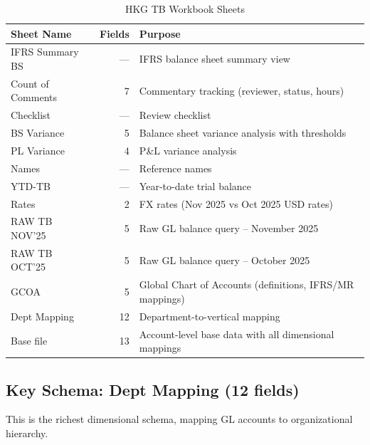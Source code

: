 \documentclass[11pt,a4paper]{article}
\begin{document}
\begin{table}[H]
\centering
\caption{HKG TB Workbook Sheets}
\begin{tabularx}{\textwidth}{lrX}
\toprule
\textbf{Sheet Name} & \textbf{Fields} & \textbf{Purpose} \\
\midrule
IFRS Summary BS   & ---  & IFRS balance sheet summary view \\
Count of Comments  & 7   & Commentary tracking (reviewer, status, hours) \\
Checklist          & ---  & Review checklist \\
BS Variance        & 5   & Balance sheet variance analysis with thresholds \\
PL Variance        & 4   & P\&L variance analysis \\
Names              & ---  & Reference names \\
YTD-TB             & ---  & Year-to-date trial balance \\
Rates              & 2   & FX rates (Nov 2025 vs Oct 2025 USD rates) \\
RAW TB NOV'25      & 5   & Raw GL balance query -- November 2025 \\
RAW TB OCT'25      & 5   & Raw GL balance query -- October 2025 \\
GCOA               & 5   & Global Chart of Accounts (definitions, IFRS/MR mappings) \\
Dept Mapping       & 12  & Department-to-vertical mapping \\
Base file          & 13  & Account-level base data with all dimensional mappings \\
\bottomrule
\end{tabularx}
\end{table}

\subsection{Key Schema: Dept Mapping (12 fields)}

This is the richest dimensional schema, mapping GL accounts to organizational hierarchy.
\end{document}
